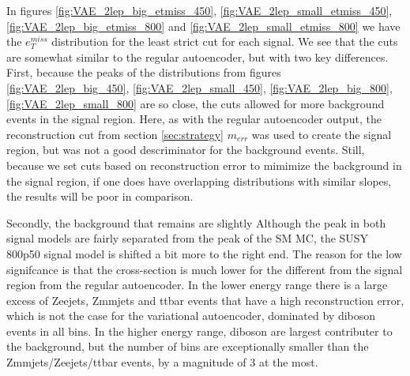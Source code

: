 In figures \ref{fig:VAE_2lep_big_etmiss_450}, \ref{fig:VAE_2lep_small_etmiss_450}, 
\ref{fig:VAE_2lep_big_etmiss_800} and  \ref{fig:VAE_2lep_small_etmiss_800} we have 
the $e_T^{miss}$ distribution for the least strict cut for each signal. We see that 
the cuts are somewhat similar to the regular autoencoder, but with two key differences.
First, because the peaks of the distributions from figures \ref{fig:VAE_2lep_big_450}, 
\ref{fig:VAE_2lep_small_450}, \ref{fig:VAE_2lep_big_800}, \ref{fig:VAE_2lep_small_800} 
are so close, the cuts allowed for more background events in the signal region. Here, 
as with the regular autoencoder output, the reconstruction cut from section \ref{sec:strategy} 
$m_{err}$ was used to create the signal region, 
but was not a good descriminator for the background events. Still, because we set 
cuts based on reconstruction error to mimimize the background in the signal region, 
if one does have overlapping distributions with similar slopes, the results will be poor in comparison. \par
Secondly, the background that remains are slightly Although the peak in both
signal models are fairly separated from the peak of the SM MC, the SUSY 800p50 signal model is shifted a
bit more to the right end. The reason for the low signifcance is that the cross-section is much lower for the
different from the signal region from the regular autoencoder. In the lower energy range there 
is a large excess of Zeejets, Zmmjets and ttbar events that have a high reconstruction error, 
which is not the case for the variational autoencoder, dominated by diboson events in all bins. 
In the higher energy range, diboson are largest contributer to the background, but the number 
of bins are exceptionally smaller than the Zmmjets/Zeejets/ttbar events, by a magnitude of 3 at the most. 








